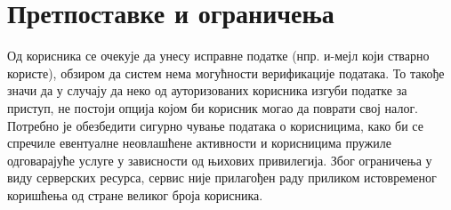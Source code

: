 \section{Претпоставке и ограничења}

Од корисника се очекује да унесу исправне податке (нпр. и-мејл који стварно користе), обзиром
да систем нема могућности верификације података. То такође значи да у случају да неко од
ауторизованих корисника изгуби податке за приступ, не постоји опција којом би корисник могао да
поврати свој налог. Потребно је обезбедити сигурно чување података о корисницима, како би се
спречиле евентуалне неовлашћене активности и корисницима пружиле одговарајуће услуге у зависности
од њихових привилегија. Због ограничења у виду серверских ресурса, сервис није прилагођен раду
приликом истовременог коришћења од стране великог броја корисника.
